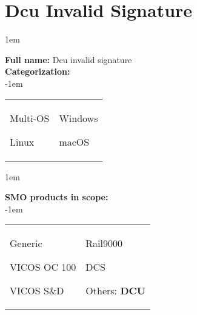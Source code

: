 
%
%

\section{Dcu Invalid Signature}
\label{15301}

\openup 1em

\textbf{Full name:} Dcu invalid signature\hrulefill \\
{\bf Categorization:} \\

\openup -1em
\vspace{-3em}

\begin{tabular}{p{}p{}}

\begin{todolist}
  	\item Multi-OS
	\item[\done] Linux
\end{todolist}
&
\begin{todolist}
	\item Windows
	\item macOS
\end{todolist}

\end{tabular}

\openup 1em

{\bf SMO products in scope:} \\

\openup -1em
\vspace{-3em}

\begin{tabular}{p{}p{}}

\begin{todolist}
  \item Generic
  \item VICOS OC 100
  \item VICOS S\&D
\end{todolist}
&
\begin{todolist}
  \item Rail9000
  \item DCS
  \item Others: \bf{DCU} \hrulefill
\end{todolist}

\end{tabular}

